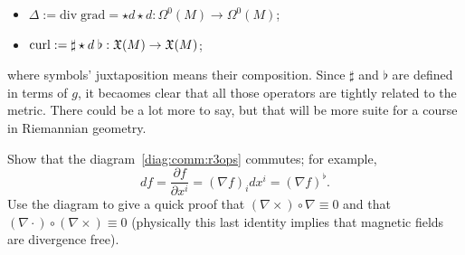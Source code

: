 \begin{example}
\begin{itemize}
    \item $\Delta := \mathrm{div}\; \mathrm{grad} = \star d \star d : \Omega^0(M) \to \Omega^0(M)$;
    \item $\mathrm{curl} := \sharp \star d\; \flat : \mathfrak{X}(M) \to \mathfrak{X}(M)$;
  \end{itemize}
  where symbols' juxtaposition means their composition.
  Since $\sharp$ and $\flat$ are defined in terms of $g$, it becaomes clear that all those operators are tightly related to the metric.
  There could be a lot more to say, but that will be more suite for a course in Riemannian geometry.
\end{example}

\begin{exercise}
  Show that the diagram~\eqref{diag:comm:r3ops} commutes; for example,
  \begin{equation}
    df = \frac{\partial f}{\partial x^i} = (\nabla f)_i dx^i = (\nabla f)^\flat.
  \end{equation}
  Use the diagram to give a quick proof that $(\nabla\times)\circ \nabla \equiv 0$ and that $(\nabla\cdot) \circ (\nabla\times) \equiv 0$ (physically this last identity implies that magnetic fields are divergence free).
\end{exercise}

